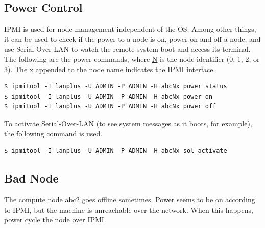 \documentclass{article}
\begin{document}
\subsection{Power Control}

IPMI is used for node management independent of the OS. Among other things, it
can be used to check if the power to a node is on, power on and off a node, and
use Serial-Over-LAN to watch the remote system boot and access its terminal.
The following are the power commands, where \url{N} is the node identifier (0,
1, 2, or 3). The \url{x} appended to the node name indicates the IPMI
interface.

\small {
\begin{verbatim}
$ ipmitool -I lanplus -U ADMIN -P ADMIN -H abcNx power status
$ ipmitool -I lanplus -U ADMIN -P ADMIN -H abcNx power on
$ ipmitool -I lanplus -U ADMIN -P ADMIN -H abcNx power off
\end{verbatim}
}

To activate Serial-Over-LAN (to see system messages as it boots, for example),
the following command is used.

\small {
\begin{verbatim}
$ ipmitool -I lanplus -U ADMIN -P ADMIN -H abcNx sol activate
\end{verbatim}
}


\subsection{Bad Node}

The compute node \url{abc2} goes offline sometimes. Power seems to be on
according to IPMI, but the machine is unreachable over the network. When this
happens, power cycle the node over IPMI.
\end{document}
